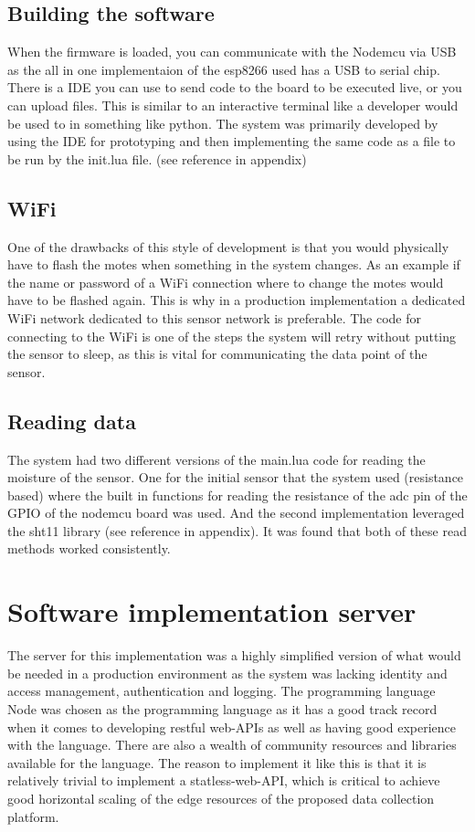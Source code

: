\documentclass[]{uiophd}
\begin{document}
\subsection{Building the software}
When the firmware is loaded, you can communicate with the Nodemcu via USB as the all in one implementaion of the esp8266 used has a USB to serial chip. There is a IDE you can use to send code to the board to be executed live, or you can upload files. This is similar to an interactive terminal like a developer would be used to in something like python. The system was primarily developed by using the IDE for prototyping and then implementing the same code as a file to be run by the init.lua file. (see reference in appendix)
\subsection{WiFi}
One of the drawbacks of this style of development is that you would physically have to flash the motes when something in the system changes. As an example if the name or password of a WiFi connection where to change the motes would have to be flashed again. This is why in a production implementation a dedicated WiFi network dedicated to this sensor network is preferable. The code for connecting to the WiFi is one of the steps the system will retry without putting the sensor to sleep, as this is vital for communicating the data point of the sensor.
\subsection{Reading data}
The system had two different versions of the main.lua code for reading the moisture of the sensor. One for the initial sensor that the system used (resistance based) where the built in functions for reading the resistance of the adc pin of the GPIO of the nodemcu board was used. And the second implementation leveraged the sht11 library (see reference in appendix). It was found that both of these read methods worked consistently.
\section{Software implementation server}
The server for this implementation was a highly simplified version of what would be needed in a production environment as the system was lacking identity and access management, authentication and logging. The programming language Node was chosen as the programming language as it has a good track record when it comes to developing restful web-APIs as well as having good experience with the language. There are also a wealth of community resources and libraries available for the language. The reason to implement it like this is that it is relatively trivial to implement a statless-web-API, which is critical to achieve good horizontal scaling of the edge resources of the proposed data collection platform.
\end{document}

